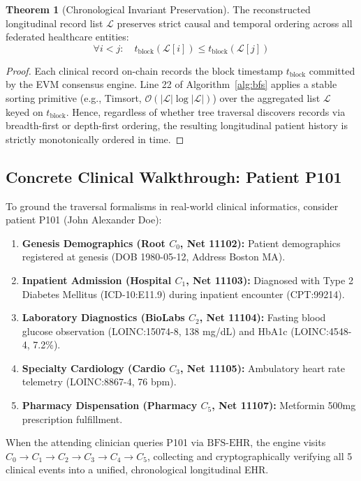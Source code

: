 \documentclass[journal]{IEEEtran}
\theoremstyle{definition}
\newtheorem{theorem}{Theorem}
\begin{document}
\begin{theorem}[Chronological Invariant Preservation]
\label{thm:chronology}
The reconstructed longitudinal record list $\mathcal{L}$ preserves strict causal and temporal ordering across all federated healthcare entities:
\begin{equation}
\forall i < j: \quad t_{\text{block}}(\mathcal{L}[i]) \le t_{\text{block}}(\mathcal{L}[j])
\end{equation}
\end{theorem}

\begin{proof}
Each clinical record on-chain records the block timestamp $t_{\text{block}}$ committed by the EVM consensus engine. Line 22 of Algorithm~\ref{alg:bfs} applies a stable sorting primitive (e.g., Timsort, $\mathcal{O}(|\mathcal{L}| \log |\mathcal{L}|)$) over the aggregated list $\mathcal{L}$ keyed on $t_{\text{block}}$. Hence, regardless of whether tree traversal discovers records via breadth-first or depth-first ordering, the resulting longitudinal patient history is strictly monotonically ordered in time.
\end{proof}

\subsection{Concrete Clinical Walkthrough: Patient P101}
To ground the traversal formalisms in real-world clinical informatics, consider patient P101 (John Alexander Doe):
\begin{enumerate}
    \item \textbf{Genesis Demographics (Root $C_0$, Net 11102):} Patient demographics registered at genesis (DOB 1980-05-12, Address Boston MA).
    \item \textbf{Inpatient Admission (Hospital $C_1$, Net 11103):} Diagnosed with Type 2 Diabetes Mellitus (ICD-10:E11.9) during inpatient encounter (CPT:99214).
    \item \textbf{Laboratory Diagnostics (BioLabs $C_2$, Net 11104):} Fasting blood glucose observation (LOINC:15074-8, 138 mg/dL) and HbA1c (LOINC:4548-4, 7.2\%).
    \item \textbf{Specialty Cardiology (Cardio $C_3$, Net 11105):} Ambulatory heart rate telemetry (LOINC:8867-4, 76 bpm).
    \item \textbf{Pharmacy Dispensation (Pharmacy $C_5$, Net 11107):} Metformin 500mg prescription fulfillment.
\end{enumerate}
When the attending clinician queries P101 via $\text{BFS-EHR}$, the engine visits $C_0 \to C_1 \to C_2 \to C_3 \to C_4 \to C_5$, collecting and cryptographically verifying all 5 clinical events into a unified, chronological longitudinal EHR.
\end{document}
